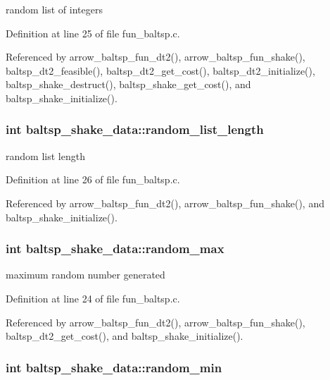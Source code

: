 random list of integers 

Definition at line 25 of file fun\_\-baltsp.c.

Referenced by arrow\_\-baltsp\_\-fun\_\-dt2(), arrow\_\-baltsp\_\-fun\_\-shake(), baltsp\_\-dt2\_\-feasible(), baltsp\_\-dt2\_\-get\_\-cost(), baltsp\_\-dt2\_\-initialize(), baltsp\_\-shake\_\-destruct(), baltsp\_\-shake\_\-get\_\-cost(), and baltsp\_\-shake\_\-initialize().\hypertarget{structbaltsp__shake__data_01579fcf6bec2dbaf736a5f8e0f21950}{
\subsubsection[{random\_\-list\_\-length}]{\setlength{\rightskip}{0pt plus 5cm}int {\bf baltsp\_\-shake\_\-data::random\_\-list\_\-length}}}
\label{structbaltsp__shake__data_01579fcf6bec2dbaf736a5f8e0f21950}


random list length 

Definition at line 26 of file fun\_\-baltsp.c.

Referenced by arrow\_\-baltsp\_\-fun\_\-dt2(), arrow\_\-baltsp\_\-fun\_\-shake(), and baltsp\_\-shake\_\-initialize().\hypertarget{structbaltsp__shake__data_4a9235d8af82165777da9bf0b721bb5a}{
\subsubsection[{random\_\-max}]{\setlength{\rightskip}{0pt plus 5cm}int {\bf baltsp\_\-shake\_\-data::random\_\-max}}}
\label{structbaltsp__shake__data_4a9235d8af82165777da9bf0b721bb5a}


maximum random number generated 

Definition at line 24 of file fun\_\-baltsp.c.

Referenced by arrow\_\-baltsp\_\-fun\_\-dt2(), arrow\_\-baltsp\_\-fun\_\-shake(), baltsp\_\-dt2\_\-get\_\-cost(), and baltsp\_\-shake\_\-initialize().\hypertarget{structbaltsp__shake__data_be2ebebdb37a3ff79d221c8793f8745e}{
\subsubsection[{random\_\-min}]{\setlength{\rightskip}{0pt plus 5cm}int {\bf baltsp\_\-shake\_\-data::random\_\-min}}}
\label{structbaltsp__shake__data_be2ebebdb37a3ff79d221c8793f8745e}


